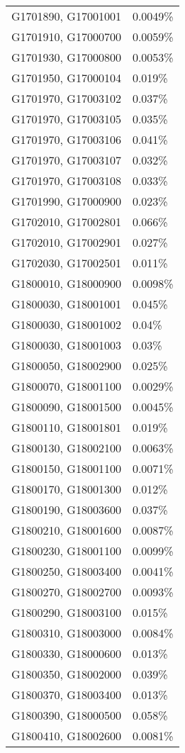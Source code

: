\begin{longtable}[]{@{}ll@{}}
G1701890, G17001001 & 0.0049\% \\
G1701910, G17000700 & 0.0059\% \\
G1701930, G17000800 & 0.0053\% \\
G1701950, G17000104 & 0.019\% \\
G1701970, G17003102 & 0.037\% \\
G1701970, G17003105 & 0.035\% \\
G1701970, G17003106 & 0.041\% \\
G1701970, G17003107 & 0.032\% \\
G1701970, G17003108 & 0.033\% \\
G1701990, G17000900 & 0.023\% \\
G1702010, G17002801 & 0.066\% \\
G1702010, G17002901 & 0.027\% \\
G1702030, G17002501 & 0.011\% \\
G1800010, G18000900 & 0.0098\% \\
G1800030, G18001001 & 0.045\% \\
G1800030, G18001002 & 0.04\% \\
G1800030, G18001003 & 0.03\% \\
G1800050, G18002900 & 0.025\% \\
G1800070, G18001100 & 0.0029\% \\
G1800090, G18001500 & 0.0045\% \\
G1800110, G18001801 & 0.019\% \\
G1800130, G18002100 & 0.0063\% \\
G1800150, G18001100 & 0.0071\% \\
G1800170, G18001300 & 0.012\% \\
G1800190, G18003600 & 0.037\% \\
G1800210, G18001600 & 0.0087\% \\
G1800230, G18001100 & 0.0099\% \\
G1800250, G18003400 & 0.0041\% \\
G1800270, G18002700 & 0.0093\% \\
G1800290, G18003100 & 0.015\% \\
G1800310, G18003000 & 0.0084\% \\
G1800330, G18000600 & 0.013\% \\
G1800350, G18002000 & 0.039\% \\
G1800370, G18003400 & 0.013\% \\
G1800390, G18000500 & 0.058\% \\
G1800410, G18002600 & 0.0081\% \\

\end{longtable}
